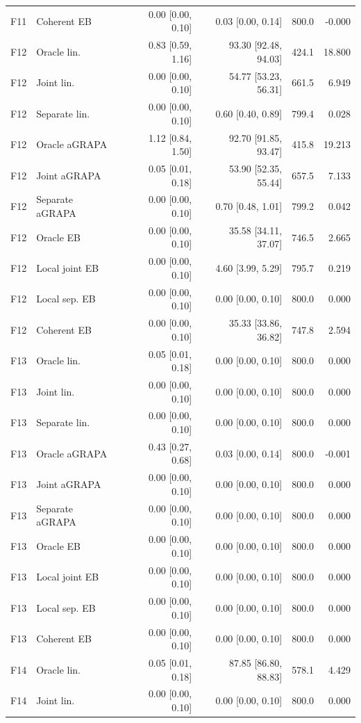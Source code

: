 \begin{longtable}{llrrrr}
F11 & Coherent EB & 0.00 [0.00, 0.10] & 0.03 [0.00, 0.14] & 800.0 & -0.000\\
F12 & Oracle lin. & 0.83 [0.59, 1.16] & 93.30 [92.48, 94.03] & 424.1 & 18.800\\
F12 & Joint lin. & 0.00 [0.00, 0.10] & 54.77 [53.23, 56.31] & 661.5 & 6.949\\
F12 & Separate lin. & 0.00 [0.00, 0.10] & 0.60 [0.40, 0.89] & 799.4 & 0.028\\
F12 & Oracle aGRAPA & 1.12 [0.84, 1.50] & 92.70 [91.85, 93.47] & 415.8 & 19.213\\
F12 & Joint aGRAPA & 0.05 [0.01, 0.18] & 53.90 [52.35, 55.44] & 657.5 & 7.133\\
F12 & Separate aGRAPA & 0.00 [0.00, 0.10] & 0.70 [0.48, 1.01] & 799.2 & 0.042\\
F12 & Oracle EB & 0.00 [0.00, 0.10] & 35.58 [34.11, 37.07] & 746.5 & 2.665\\
F12 & Local joint EB & 0.00 [0.00, 0.10] & 4.60 [3.99, 5.29] & 795.7 & 0.219\\
F12 & Local sep. EB & 0.00 [0.00, 0.10] & 0.00 [0.00, 0.10] & 800.0 & 0.000\\
F12 & Coherent EB & 0.00 [0.00, 0.10] & 35.33 [33.86, 36.82] & 747.8 & 2.594\\
F13 & Oracle lin. & 0.05 [0.01, 0.18] & 0.00 [0.00, 0.10] & 800.0 & 0.000\\
F13 & Joint lin. & 0.00 [0.00, 0.10] & 0.00 [0.00, 0.10] & 800.0 & 0.000\\
F13 & Separate lin. & 0.00 [0.00, 0.10] & 0.00 [0.00, 0.10] & 800.0 & 0.000\\
F13 & Oracle aGRAPA & 0.43 [0.27, 0.68] & 0.03 [0.00, 0.14] & 800.0 & -0.001\\
F13 & Joint aGRAPA & 0.00 [0.00, 0.10] & 0.00 [0.00, 0.10] & 800.0 & 0.000\\
F13 & Separate aGRAPA & 0.00 [0.00, 0.10] & 0.00 [0.00, 0.10] & 800.0 & 0.000\\
F13 & Oracle EB & 0.00 [0.00, 0.10] & 0.00 [0.00, 0.10] & 800.0 & 0.000\\
F13 & Local joint EB & 0.00 [0.00, 0.10] & 0.00 [0.00, 0.10] & 800.0 & 0.000\\
F13 & Local sep. EB & 0.00 [0.00, 0.10] & 0.00 [0.00, 0.10] & 800.0 & 0.000\\
F13 & Coherent EB & 0.00 [0.00, 0.10] & 0.00 [0.00, 0.10] & 800.0 & 0.000\\
F14 & Oracle lin. & 0.05 [0.01, 0.18] & 87.85 [86.80, 88.83] & 578.1 & 4.429\\
F14 & Joint lin. & 0.00 [0.00, 0.10] & 0.00 [0.00, 0.10] & 800.0 & 0.000\\

\end{longtable}
